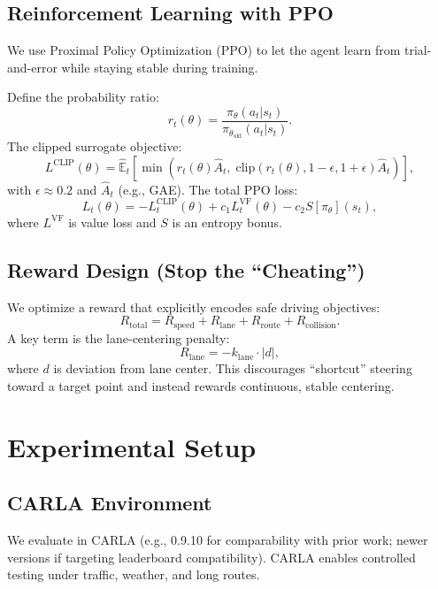 \documentclass[11pt]{article}
\begin{document}
\subsection{Reinforcement Learning with PPO}
We use Proximal Policy Optimization (PPO) to let the agent learn from trial-and-error while staying stable during training.

Define the probability ratio:
\begin{equation}
r_t(\theta)=\frac{\pi_\theta(a_t|s_t)}{\pi_{\theta_{\text{old}}}(a_t|s_t)}.
\end{equation}
The clipped surrogate objective:
\begin{equation}
L^{\text{CLIP}}(\theta)=\hat{\mathbb{E}}_t\left[
\min\left(
r_t(\theta)\hat{A}_t,\;
\mathrm{clip}(r_t(\theta),1-\epsilon,1+\epsilon)\hat{A}_t
\right)\right],
\end{equation}
with $\epsilon\approx 0.2$ and $\hat{A}_t$ (e.g., GAE). The total PPO loss:
\begin{equation}
L_t(\theta)=-L^{\text{CLIP}}_t(\theta)+c_1L^{\text{VF}}_t(\theta)-c_2 S[\pi_\theta](s_t),
\end{equation}
where $L^{\text{VF}}$ is value loss and $S$ is an entropy bonus.

\subsection{Reward Design (Stop the ``Cheating'')}
We optimize a reward that explicitly encodes safe driving objectives:
\begin{equation}
R_{\text{total}} = R_{\text{speed}} + R_{\text{lane}} + R_{\text{route}} + R_{\text{collision}}.
\end{equation}
A key term is the lane-centering penalty:
\begin{equation}
R_{\text{lane}}=-k_{\text{lane}}\cdot |d|,
\end{equation}
where $d$ is deviation from lane center. This discourages ``shortcut'' steering toward a target point and instead rewards continuous, stable centering.

\section{Experimental Setup}

\subsection{CARLA Environment}
We evaluate in CARLA (e.g., 0.9.10 for comparability with prior work; newer versions if targeting leaderboard compatibility). CARLA enables controlled testing under traffic, weather, and long routes.
\end{document}
